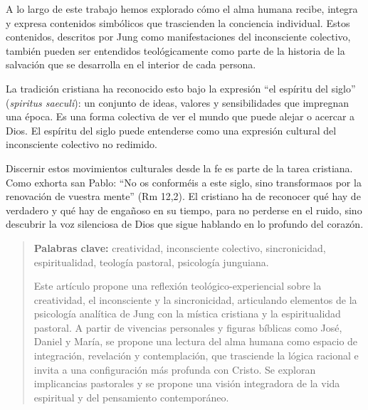 \documentclass[12pt]{article}
\begin{document}
A lo largo de este trabajo hemos explorado cómo el alma humana recibe, integra y expresa contenidos simbólicos que trascienden la conciencia individual. Estos contenidos, descritos por Jung como manifestaciones del inconsciente colectivo, también pueden ser entendidos teológicamente como parte de la historia de la salvación que se desarrolla en el interior de cada persona.

La tradición cristiana ha reconocido esto bajo la expresión “el espíritu del siglo” (\textit{spiritus saeculi}): un conjunto de ideas, valores y sensibilidades que impregnan una época. Es una forma colectiva de ver el mundo que puede alejar o acercar a Dios. El espíritu del siglo puede entenderse como una expresión cultural del inconsciente colectivo no redimido.

Discernir estos movimientos culturales desde la fe es parte de la tarea cristiana. Como exhorta san Pablo: “No os conforméis a este siglo, sino transformaos por la renovación de vuestra mente” (Rm 12,2). El cristiano ha de reconocer qué hay de verdadero y qué hay de engañoso en su tiempo, para no perderse en el ruido, sino descubrir la voz silenciosa de Dios que sigue hablando en lo profundo del corazón.

\begin{abstract}
	\textbf{Palabras clave:} creatividad, inconsciente colectivo, sincronicidad, espiritualidad, teología pastoral, psicología junguiana.
	
	Este artículo propone una reflexión teológico-experiencial sobre la creatividad, el inconsciente y la sincronicidad, articulando elementos de la psicología analítica de Jung con la mística cristiana y la espiritualidad pastoral. A partir de vivencias personales y figuras bíblicas como José, Daniel y María, se propone una lectura del alma humana como espacio de integración, revelación y contemplación, que trasciende la lógica racional e invita a una configuración más profunda con Cristo. Se exploran implicancias pastorales y se propone una visión integradora de la vida espiritual y del pensamiento contemporáneo.
\end{abstract}
\end{document}
